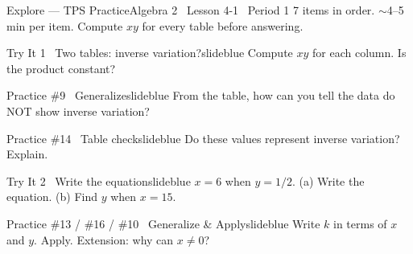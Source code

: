 \documentclass[aspectratio=169, 11pt]{beamer}
\begin{document}
\begin{frame}{Explore --- TPS Practice}{Algebra 2 \textperiodcentered\ Lesson 4-1 \textperiodcentered\ Period 1}
\small\textcolor{slidegray}{7 items in order. \(\sim\)4--5 min per item. Compute \(xy\) for every table before answering.}

\vspace{0.1cm}
\begin{projcard}{Try It 1 \textperiodcentered\ Two tables: inverse variation?}{slideblue}
Compute \(xy\) for each column. Is the product constant?
\end{projcard}
\vspace{-0.2cm}
\begin{projcard}{Practice \#9 \textperiodcentered\ Generalize}{slideblue}
From the table, how can you tell the data do NOT show inverse variation?
\end{projcard}
\vspace{-0.2cm}
\begin{projcard}{Practice \#14 \textperiodcentered\ Table check}{slideblue}
Do these values represent inverse variation? Explain.
\end{projcard}
\vspace{-0.2cm}
\begin{projcard}{Try It 2 \textperiodcentered\ Write the equation}{slideblue}
\(x = 6\) when \(y = 1/2\). (a) Write the equation. (b) Find \(y\) when \(x = 15\).
\end{projcard}
\vspace{-0.2cm}
\begin{projcard}{Practice \#13 / \#16 / \#10 \textperiodcentered\ Generalize \& Apply}{slideblue}
Write \(k\) in terms of \(x\) and \(y\). Apply. Extension: why can \(x \neq 0\)?
\end{projcard}
\end{frame}
\end{document}
